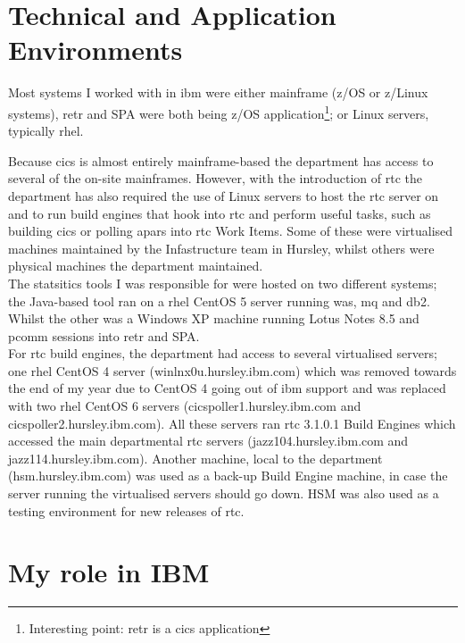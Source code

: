 \documentclass[a4paper,11pt]{report}
\begin{document}
\chapter{Technical and Application Environments}

Most systems I worked with in \gls{ibm} were either mainframe (z/OS or z/Linux systems), \gls{retr}
and SPA were both being z/OS application\footnote{Interesting point: \gls{retr} is a \gls{cics} 
application}; or Linux servers, typically \gls{rhel}.

Because \gls{cics} is almost entirely mainframe-based the department has access to several of the
on-site mainframes. However, with the introduction of \gls{rtc} the department has also required
the use of Linux servers to host the \gls{rtc} server on and to run build engines that hook into
\gls{rtc} and perform useful tasks, such as building \gls{cics} or polling \gls{apar}s into 
\gls{rtc} Work Items. Some of these were virtualised machines maintained by the Infastructure team
in Hursley, whilst others were physical machines the department maintained. \\



The statsitics tools I was responsible for were hosted on two different systems; the Java-based
tool ran on a \gls{rhel} CentOS 5 server running \gls{was}, \gls{mq} and \gls{db2}. Whilst the 
other was a Windows XP machine running Lotus Notes 8.5 and \gls{pcomm} sessions into \gls{retr} and
SPA. \\



For \gls{rtc} build engines, the department had access to several virtualised servers; one 
\gls{rhel} CentOS 4 server (winlnx0u.hursley.ibm.com) which was removed towards the end of my year
due to CentOS 4 going out of \gls{ibm} support and was replaced with two \gls{rhel} CentOS 6 
servers (cicspoller1.hursley.ibm.com and cicspoller2.hursley.ibm.com). All these servers ran 
\gls{rtc} 3.1.0.1 Build Engines which accessed the main departmental \gls{rtc} servers
(jazz104.hursley.ibm.com and jazz114.hursley.ibm.com). Another machine, local to the department
(hsm.hursley.ibm.com) was used as a back-up Build Engine machine, in case the server running the
virtualised servers should go down. HSM was also used as a testing environment for new releases of
\gls{rtc}.


\chapter{My role in IBM}
\end{document}
